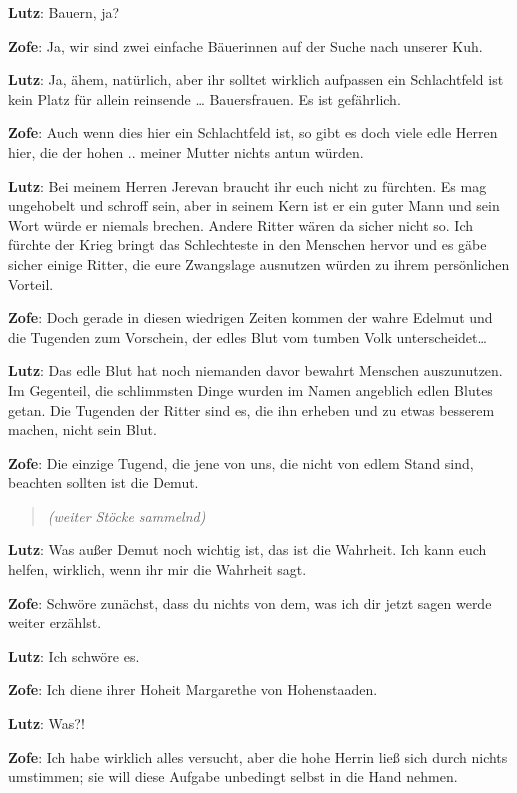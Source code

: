 \documentclass[a5paper,6pt]{book}
\begin{document}
\textbf{Lutz}: Bauern, ja?

\textbf{Zofe}: Ja, wir sind zwei einfache Bäuerinnen auf der Suche nach unserer Kuh.

\textbf{Lutz}: Ja, ähem, natürlich, aber ihr solltet wirklich aufpassen ein Schlachtfeld ist kein Platz für allein reinsende … Bauersfrauen. Es ist gefährlich.

\textbf{Zofe}: Auch wenn dies hier ein Schlachtfeld ist, so gibt es doch viele edle Herren hier, die der hohen .. meiner Mutter nichts antun würden.

\textbf{Lutz}: Bei meinem Herren Jerevan braucht ihr euch nicht zu fürchten. Es mag ungehobelt und schroff sein, aber in seinem Kern ist er ein guter Mann und sein Wort würde er niemals brechen.
Andere Ritter wären da sicher nicht so. Ich fürchte der Krieg bringt das Schlechteste in den Menschen hervor und es gäbe sicher einige Ritter, die eure Zwangslage ausnutzen würden zu ihrem persönlichen Vorteil.

\textbf{Zofe}: Doch gerade in diesen wiedrigen Zeiten kommen der wahre Edelmut und die Tugenden zum Vorschein, der edles Blut vom tumben Volk unterscheidet…

\textbf{Lutz}: Das edle Blut hat noch niemanden davor bewahrt Menschen auszunutzen. Im Gegenteil, die schlimmsten Dinge wurden im Namen angeblich edlen Blutes getan.
Die Tugenden der Ritter sind es, die ihn erheben und zu etwas besserem machen, nicht sein Blut.

\textbf{Zofe}: Die einzige Tugend, die jene von uns, die nicht von edlem Stand sind, beachten sollten ist die Demut.

\begin{quote}
  \textit{(weiter Stöcke sammelnd)}
 \end{quote}


\textbf{Lutz}: Was außer Demut noch wichtig ist, das ist die Wahrheit. Ich kann euch helfen, wirklich, wenn ihr mir die Wahrheit sagt.

\textbf{Zofe}: Schwöre zunächst, dass du nichts von dem, was ich dir jetzt sagen werde weiter erzählst.

\textbf{Lutz}: Ich schwöre es.

\textbf{Zofe}: Ich diene ihrer Hoheit Margarethe von Hohenstaaden.

\textbf{Lutz}: Was?!

\textbf{Zofe}: Ich habe wirklich alles versucht, aber die hohe Herrin ließ sich durch nichts umstimmen; sie will diese Aufgabe unbedingt selbst in die Hand nehmen.
\end{document}
